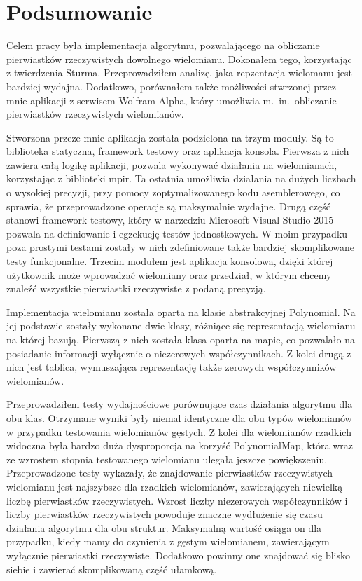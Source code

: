 \chapter{Podsumowanie}

Celem pracy była implementacja algorytmu, pozwalającego na obliczanie pierwiastków rzeczywistych dowolnego wielomianu. Dokonałem tego, korzystając z twierdzenia Sturma. Przeprowadziłem analizę, jaka repzentacja wielomanu jest bardziej wydajna. Dodatkowo, porównałem także możliwości stwrzonej przez mnie aplikacji z serwisem Wolfram Alpha, który umożliwia m.\ in.\ obliczanie pierwiastków rzeczywistych wielomianów.

Stworzona przeze mnie aplikacja została podzielona na trzym moduły. Są to biblioteka statyczna, framework testowy oraz aplikacja konsola. Pierwsza z nich zawiera całą logikę aplikacji, pozwala wykonywać działania na wielomianach, korzystając z biblioteki mpir. Ta ostatnia umożliwia działania na dużych liczbach o wysokiej precyzji, przy pomocy zoptymalizowanego kodu asemblerowego, co sprawia, że przeprowadzone operacje są maksymalnie wydajne. Drugą część stanowi framework testowy, który w narzedziu Microsoft Visual Studio 2015 pozwala na definiowanie i egzekucję testów jednostkowych. W moim przypadku poza prostymi testami zostały w nich zdefiniowane także bardziej skomplikowane testy funkcjonalne. Trzecim modułem jest aplikacja konsolowa, dzięki której użytkownik może wprowadzać wielomiany oraz przedział, w którym chcemy znaleźć wszystkie pierwiastki rzeczywiste z podaną precyzją.

Implementacja wielomianu została oparta na klasie abstrakcyjnej Polynomial. Na jej podstawie zostały wykonane dwie klasy, różniące się reprezentacją wielomianu na której bazują. Pierwszą z nich została klasa oparta na mapie, co pozwalało na posiadanie informacji wyłącznie o niezerowych współczynnikach. Z kolei drugą z nich jest tablica, wymuszająca reprezentację także zerowych współczynników wielomianów.

Przeprowadziłem testy wydajnościowe porównujące czas działania algorytmu dla obu klas. Otrzymane wyniki były niemal identyczne dla obu typów wielomianów w przypadku testowania wielomianów gęstych. Z kolei dla wielomianów rzadkich widoczna była bardzo duża dysproporcja na korzyść PolynomialMap, która wraz ze wzrostem stopnia testowanego wielomianu ulegała jeszcze powiększeniu. Przeprowadzone testy wykazały, że znajdowanie pierwiastków rzeczywistych wielomianu jest najszybsze dla rzadkich wielomianów, zawierających niewielką liczbę pierwiastków rzeczywistych. Wzrost liczby niezerowych współczynników i liczby pierwiastków rzeczywistych powoduje znaczne wydłużenie się czasu działania algorytmu dla obu struktur. Maksymalną wartość osiąga on dla przypadku, kiedy mamy do czynienia z gęstym wielomianem, zawierającym wyłącznie pierwiastki rzeczywiste. Dodatkowo powinny one znajdować się blisko siebie i zawierać skomplikowaną część ułamkową.

